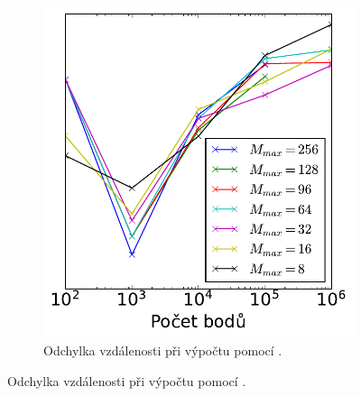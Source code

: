 \begin{figure}
\begin{subfigure}[t]{0.49\columnwidth}
\end{subfigure}
\hfill
\begin{subfigure}[t]{0.49\columnwidth}
    \centering  
    \includegraphics[scale=0.6]{obrazky-figures/benchmark/accuracy/normal/acccurucy_leaf_err_distance.pdf}
    \caption{Odchylka vzdálenosti při výpočtu pomocí .}


\end{subfigure}
\end{figure}
